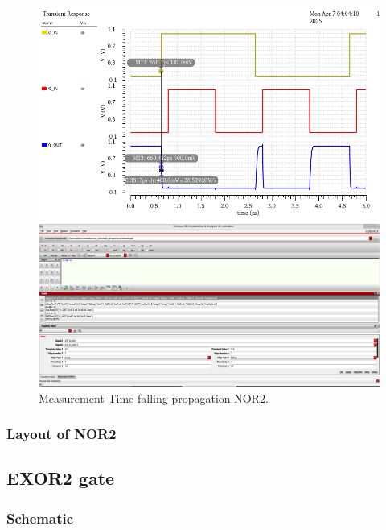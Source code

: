 \begin{figure}[H]
	\begin{minipage}{0.5\linewidth}
		\includegraphics[width=\linewidth]{section/EX1/NOR/EX1_NOR2_Tpdf_Waveform.png}
	\end{minipage}
	\begin{minipage}{0.5\linewidth}
		\includegraphics[width=\linewidth]{section/EX1/NOR/EX1_NOR2_Tpdf_Cal.png}
	\end{minipage}
	\caption{Measurement Time falling propagation NOR2.}
\end{figure}

\subsubsection{Layout of NOR2}

\subsection{EXOR2 gate}

\subsubsection{Schematic}

